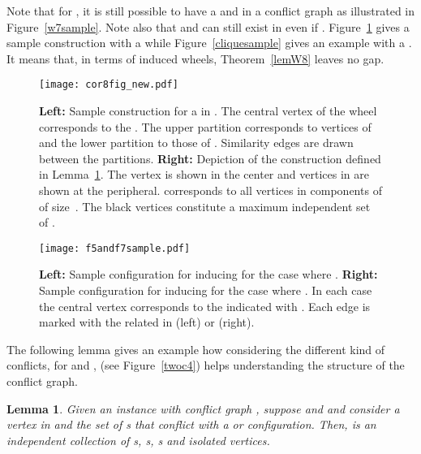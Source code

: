 \documentclass[final]{dmtcs-episciences}
\newtheorem{lemma}[theorem]{Lemma}
\begin{document}
Note that for , it is still possible to have a  and 
 in a conflict graph  as illustrated in Figure~\ref{w7sample}. Note also that   and  can still exist in  even if . Figure~\ref{cor8fig} gives a sample construction with a  while Figure~\ref{cliquesample} gives an example with a . 
It means that, in terms of induced wheels, Theorem~\ref{lemW8}  leaves no gap. 


  
  \begin{figure}[t]     
\begin{center}	   
\texttt{[image: cor8fig\_new.pdf]} 
\caption{\sf \textbf{Left:} Sample construction for a  in . The central vertex of the wheel corresponds to the   . The upper partition corresponds to vertices of  and the lower partition to those of . Similarity edges are drawn between the partitions. \textbf{ Right:} Depiction of the construction defined in Lemma~\ref{lem:F8}. The vertex   is shown in the center and vertices in  are shown at the peripheral.  corresponds to all vertices in components of  of size~. The black vertices constitute a maximum independent set of . 
} 
\label{cor8fig}	   
\end{center}	   
\end{figure}  


\begin{figure}[t]	   
\begin{center}	   
\texttt{[image: f5andf7sample.pdf]} 
\caption{\sf \textbf{ Left:} Sample configuration for  inducing
 for the case where . 
\textbf{Right:} Sample configuration for  inducing  
for the case where . In each case 
the central vertex corresponds to the   
indicated with . 
Each  edge is marked with the related   in  (left) or  (right). 
} 
\label{f5and7sample}	   
\end{center}	   
\end{figure}



The following lemma gives an example how considering the different kind of conflicts, for  and , (see Figure~\ref{twoc4}) helps understanding the structure of the conflict graph. 

\begin{lemma}\label{lem:F8}
Given an instance  with conflict graph , suppose  and  and consider a vertex  in  and the set  of s that conflict  with a  or  configuration. Then,  is an independent collection of s, s, s and isolated vertices.\end{lemma}
\end{document}
